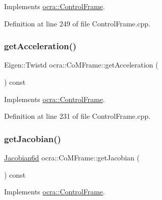 Implements \hyperlink{classocra_1_1ControlFrame_a65833d1f3f42bc8d452f8b1fb671e142}{ocra\+::\+Control\+Frame}.



Definition at line 249 of file Control\+Frame.\+cpp.

\hypertarget{classocra_1_1CoMFrame_a9e59ca65720c553da5c75f484544829c}{}\label{classocra_1_1CoMFrame_a9e59ca65720c553da5c75f484544829c} 
\subsubsection{\texorpdfstring{get\+Acceleration()}{getAcceleration()}}
{\footnotesize\ttfamily Eigen\+::\+Twistd ocra\+::\+Co\+M\+Frame\+::get\+Acceleration (\begin{DoxyParamCaption}{ }\end{DoxyParamCaption}) const\hspace{0.3cm}{\ttfamily [virtual]}}



Implements \hyperlink{classocra_1_1ControlFrame_a0ceb7cd7c3fe90fa0ef311b96a6f5c88}{ocra\+::\+Control\+Frame}.



Definition at line 231 of file Control\+Frame.\+cpp.

\hypertarget{classocra_1_1CoMFrame_ab24f3400af3e8eb2a12d6597ff8a7a31}{}\label{classocra_1_1CoMFrame_ab24f3400af3e8eb2a12d6597ff8a7a31} 
\subsubsection{\texorpdfstring{get\+Jacobian()}{getJacobian()}}
{\footnotesize\ttfamily \hyperlink{namespaceocra_ac73b015f9f7cb0c252c4d5c4800f559a}{Jacobian6d} ocra\+::\+Co\+M\+Frame\+::get\+Jacobian (\begin{DoxyParamCaption}{ }\end{DoxyParamCaption}) const\hspace{0.3cm}{\ttfamily [virtual]}}



Implements \hyperlink{classocra_1_1ControlFrame_a14e0b855979be5dbd360314f25191e77}{ocra\+::\+Control\+Frame}.



